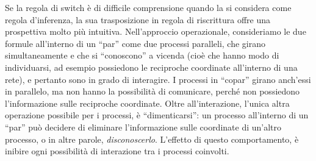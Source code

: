 \documentclass[12pt,a4paper,openright,twoside]{report}
\begin{document}
Se la regola di switch \`e di difficile comprensione quando la si considera come regola d'inferenza, la sua trasposizione in regola di riscrittura offre una prospettiva molto pi\`u intuitiva. Nell'approccio operazionale, consideriamo le due formule all'interno di un ``par'' come due processi paralleli, che girano simultaneamente e che si ``conoscono'' a vicenda (cio\`e che hanno modo di individuarsi, ad esempio possiedono le reciproche coordinate all'interno di una rete), e pertanto sono in grado di interagire. I processi in ``copar'' girano anch'essi in parallelo, ma non hanno la possibilit\`a di comunicare, perch\'e non possiedono l'informazione sulle reciproche coordinate. Oltre all'interazione, l'unica altra operazione possibile per i processi, \`e ``dimenticarsi'': un processo all'interno di un ``par'' pu\`o decidere di eliminare l'informazione sulle coordinate di un'altro processo, o in altre parole, \emph{disconoscerlo}. L'effetto di questo comportamento, \`e inibire ogni possibilit\`a di interazione tra i processi coinvolti.
\end{document}
